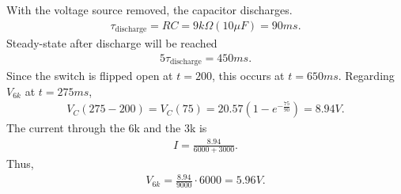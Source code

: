 \documentclass{report}
\begin{document}
\begin{itemize}
            With the voltage source removed, the capacitor discharges.
            \begin{align*}
                \tau_{\text{discharge}} = RC = 9k\Omega(10\mu F) = 90ms
            .\end{align*}
            Steady-state after discharge will be reached 
            \begin{align*}
                5\tau_{\text{discharge}} = 450ms
            .\end{align*}
            Since the switch is flipped open at $t=200$, this occurs at $t=650ms$. Regarding $V_{6k}$ at $ t=275ms$,
            \begin{align*}
                V_{C}(275 - 200) = V_{C}(75) = 20.57\left(1-e^{-\frac{75}{90}}\right) = 8.94V
            .\end{align*}
            The current through the 6k and the 3k is 
            \begin{align*}
                I = \frac{8.94}{6000 + 3000}
            .\end{align*}
            Thus,
            \begin{align*}
                V_{6k} = \frac{8.94}{9000}\cdot 6000 = 5.96V
            .\end{align*}


    \end{itemize}
\end{document}
